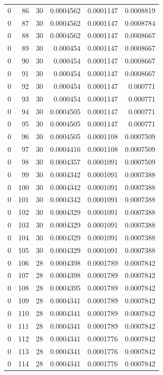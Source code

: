 \begin{tabular}{rrrrrr}
0 & 86 & 30 & 0.0004562 & 0.0001147 & 0.0008819 \\
0 & 87 & 30 & 0.0004562 & 0.0001147 & 0.0008784 \\
0 & 88 & 30 & 0.0004562 & 0.0001147 & 0.0008667 \\
0 & 89 & 30 & 0.000454 & 0.0001147 & 0.0008667 \\
0 & 90 & 30 & 0.000454 & 0.0001147 & 0.0008667 \\
0 & 91 & 30 & 0.000454 & 0.0001147 & 0.0008667 \\
0 & 92 & 30 & 0.000454 & 0.0001147 & 0.000771 \\
0 & 93 & 30 & 0.000454 & 0.0001147 & 0.000771 \\
0 & 94 & 30 & 0.0004505 & 0.0001147 & 0.000771 \\
0 & 95 & 30 & 0.0004505 & 0.0001147 & 0.000771 \\
0 & 96 & 30 & 0.0004505 & 0.0001108 & 0.0007509 \\
0 & 97 & 30 & 0.0004416 & 0.0001108 & 0.0007509 \\
0 & 98 & 30 & 0.0004357 & 0.0001091 & 0.0007509 \\
0 & 99 & 30 & 0.0004342 & 0.0001091 & 0.0007388 \\
0 & 100 & 30 & 0.0004342 & 0.0001091 & 0.0007388 \\
0 & 101 & 30 & 0.0004342 & 0.0001091 & 0.0007388 \\
0 & 102 & 30 & 0.0004329 & 0.0001091 & 0.0007388 \\
0 & 103 & 30 & 0.0004329 & 0.0001091 & 0.0007388 \\
0 & 104 & 30 & 0.0004329 & 0.0001091 & 0.0007388 \\
0 & 105 & 30 & 0.0004329 & 0.0001091 & 0.0007388 \\
0 & 106 & 28 & 0.0004398 & 0.0001789 & 0.0007842 \\
0 & 107 & 28 & 0.0004398 & 0.0001789 & 0.0007842 \\
0 & 108 & 28 & 0.0004395 & 0.0001789 & 0.0007842 \\
0 & 109 & 28 & 0.0004341 & 0.0001789 & 0.0007842 \\
0 & 110 & 28 & 0.0004341 & 0.0001789 & 0.0007842 \\
0 & 111 & 28 & 0.0004341 & 0.0001789 & 0.0007842 \\
0 & 112 & 28 & 0.0004341 & 0.0001776 & 0.0007842 \\
0 & 113 & 28 & 0.0004341 & 0.0001776 & 0.0007842 \\
0 & 114 & 28 & 0.0004341 & 0.0001776 & 0.0007842 \\

\end{tabular}
